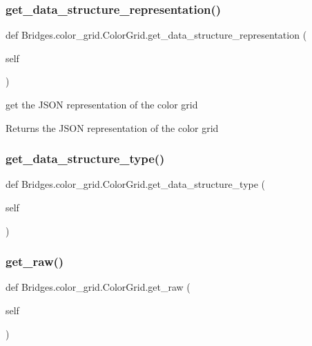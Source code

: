\subsubsection{\texorpdfstring{get\+\_\+data\+\_\+structure\+\_\+representation()}{get\_data\_structure\_representation()}}
{\footnotesize\ttfamily def Bridges.\+color\+\_\+grid.\+Color\+Grid.\+get\+\_\+data\+\_\+structure\+\_\+representation (\begin{DoxyParamCaption}\item[{}]{self }\end{DoxyParamCaption})}



get the J\+S\+ON representation of the color grid 

\begin{DoxyReturn}{Returns}
the J\+S\+ON representation of the color grid 
\end{DoxyReturn}
\mbox{\label{class_bridges_1_1color__grid_1_1_color_grid_abd68c44e314544bcf6cc8b049bda480c}} 
\subsubsection{\texorpdfstring{get\+\_\+data\+\_\+structure\+\_\+type()}{get\_data\_structure\_type()}}
{\footnotesize\ttfamily def Bridges.\+color\+\_\+grid.\+Color\+Grid.\+get\+\_\+data\+\_\+structure\+\_\+type (\begin{DoxyParamCaption}\item[{}]{self }\end{DoxyParamCaption})}

\mbox{\label{class_bridges_1_1color__grid_1_1_color_grid_a6bf3130339641f4def29589a8175c066}} 
\subsubsection{\texorpdfstring{get\+\_\+raw()}{get\_raw()}}
{\footnotesize\ttfamily def Bridges.\+color\+\_\+grid.\+Color\+Grid.\+get\+\_\+raw (\begin{DoxyParamCaption}\item[{}]{self }\end{DoxyParamCaption})}




